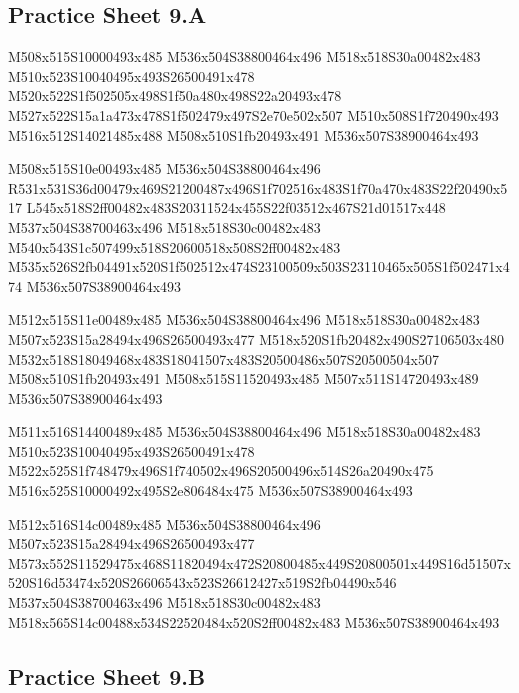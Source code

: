 \documentclass{article}
\begin{document}
\subsection{Practice Sheet 9.A}

\begin{multicols}{5}
\begin{center}

M508x515S10000493x485 %
M536x504S38800464x496 %
M518x518S30a00482x483 %
M510x523S10040495x493S26500491x478 %
M520x522S1f502505x498S1f50a480x498S22a20493x478 %
M527x522S15a1a473x478S1f502479x497S2e70e502x507 %
M510x508S1f720490x493 %
M516x512S14021485x488 %
M508x510S1fb20493x491 %
M536x507S38900464x493 %
\vfil
\columnbreak

M508x515S10e00493x485 %
M536x504S38800464x496 %
R531x531S36d00479x469S21200487x496S1f702516x483S1f70a470x483S22f20490x517 %
L545x518S2ff00482x483S20311524x455S22f03512x467S21d01517x448 %
M537x504S38700463x496 %
M518x518S30c00482x483 %
M540x543S1c507499x518S20600518x508S2ff00482x483 %
M535x526S2fb04491x520S1f502512x474S23100509x503S23110465x505S1f502471x474 %
M536x507S38900464x493 %
\vfil
\columnbreak

M512x515S11e00489x485 %
M536x504S38800464x496 %
M518x518S30a00482x483 %
M507x523S15a28494x496S26500493x477 %
M518x520S1fb20482x490S27106503x480 %
M532x518S18049468x483S18041507x483S20500486x507S20500504x507 %
M508x510S1fb20493x491 %
M508x515S11520493x485 %
M507x511S14720493x489 %
M536x507S38900464x493 %
\vfil
\columnbreak

M511x516S14400489x485 %
M536x504S38800464x496 %
M518x518S30a00482x483 %
M510x523S10040495x493S26500491x478 %
M522x525S1f748479x496S1f740502x496S20500496x514S26a20490x475 %
M516x525S10000492x495S2e806484x475 %
M536x507S38900464x493 %
\vfil
\columnbreak

M512x516S14c00489x485 %
M536x504S38800464x496 %
M507x523S15a28494x496S26500493x477 %
M573x552S11529475x468S11820494x472S20800485x449S20800501x449S16d51507x520S16d53474x520S26606543x523S26612427x519S2fb04490x546 %
M537x504S38700463x496 %
M518x518S30c00482x483 %
M518x565S14c00488x534S22520484x520S2ff00482x483 %
M536x507S38900464x493 %
\vfil

\end{center}
\end{multicols}

\subsection{Practice Sheet 9.B}
\end{document}
